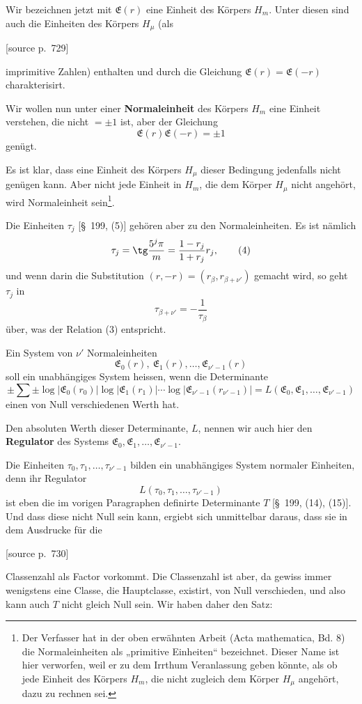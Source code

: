 \documentclass[11pt]{article}
\newcommand{\srcpage}[1]{\par\medskip\noindent\textsf{[source p.~#1]}\par\smallskip}
\begin{document}
Wir bezeichnen jetzt mit $\mathfrak E(r)$ eine Einheit des Körpers $H_m$. Unter diesen sind auch die Einheiten des Körpers $H_\mu$ (als
\srcpage{729}
imprimitive Zahlen) enthalten und durch die Gleichung $\mathfrak E(r)=\mathfrak E(-r)$ charakterisirt.

Wir wollen nun unter einer \textbf{Normaleinheit} des Körpers $H_m$ eine Einheit verstehen, die nicht $=\pm1$ ist, aber der Gleichung
\begin{equation}
\mathfrak E(r)\mathfrak E(-r)=\pm1
\tag{3}
\end{equation}
genügt.

Es ist klar, dass eine Einheit des Körpers $H_\mu$ dieser Bedingung jedenfalls nicht genügen kann. Aber nicht jede Einheit in $H_m$, die dem Körper $H_\mu$ nicht angehört, wird Normaleinheit sein\footnote{Der Verfasser hat in der oben erwähnten Arbeit (Acta mathematica, Bd. 8) die Normaleinheiten als „primitive Einheiten“ bezeichnet. Dieser Name ist hier verworfen, weil er zu dem Irrthum Veranlassung geben könnte, als ob jede Einheit des Körpers $H_m$, die nicht zugleich dem Körper $H_\mu$ angehört, dazu zu rechnen sei.}.

Die Einheiten $\tau_j$ [\S~199, (5)] gehören aber zu den Normaleinheiten. Es ist nämlich
\begin{equation}
\tau_j=\tg\frac{5^j\pi}{m}=\frac{1-r_j}{1+r_j}r_j,
\tag{4}
\end{equation}
und wenn darin die Substitution $(r,-r)=(r_\beta,r_{\beta+\nu'})$ gemacht wird, so geht $\tau_j$ in
\begin{equation}
\tau_{\beta+\nu'}=-\frac1{\tau_\beta}
\tag{5}
\end{equation}
über, was der Relation (3) entspricht.

Ein System von $\nu'$ Normaleinheiten
\[
\mathfrak E_0(r),\ \mathfrak E_1(r),\ldots,\mathfrak E_{\nu'-1}(r)
\]
soll ein unabhängiges System heissen, wenn die Determinante
\begin{equation}
\pm\sum\pm\log|\mathfrak E_0(r_0)|\log|\mathfrak E_1(r_1)|\cdots\log|\mathfrak E_{\nu'-1}(r_{\nu'-1})|
=L(\mathfrak E_0,\mathfrak E_1,\ldots,\mathfrak E_{\nu'-1})
\tag{6}
\end{equation}
einen von Null verschiedenen Werth hat.

Den absoluten Werth dieser Determinante, $L$, nennen wir auch hier den \textbf{Regulator} des Systems $\mathfrak E_0,\mathfrak E_1,\ldots,\mathfrak E_{\nu'-1}$.

Die Einheiten $\tau_0,\tau_1,\ldots,\tau_{\nu'-1}$ bilden ein unabhängiges System normaler Einheiten, denn ihr Regulator
\[
L(\tau_0,\tau_1,\ldots,\tau_{\nu'-1})
\]
ist eben die im vorigen Paragraphen definirte Determinante $T$ [\S~199, (14), (15)]. Und dass diese nicht Null sein kann, ergiebt sich unmittelbar daraus, dass sie in dem Ausdrucke für die
\srcpage{730}
Classenzahl als Factor vorkommt. Die Classenzahl ist aber, da gewiss immer wenigstens eine Classe, die Hauptclasse, existirt, von Null verschieden, und also kann auch $T$ nicht gleich Null sein. Wir haben daher den Satz:
\end{document}
